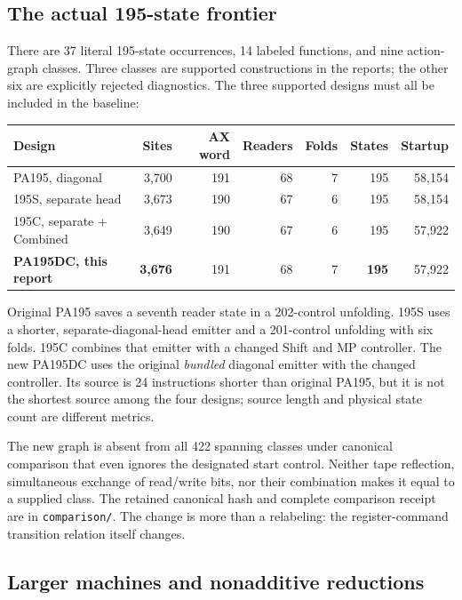 \documentclass[11pt,letterpaper]{article}
\newcommand{\file}[1]{\texttt{\nolinkurl{#1}}}
\begin{document}
\subsection{The actual 195-state frontier}

There are 37 literal 195-state occurrences, 14 labeled functions, and nine
action-graph classes. Three classes are supported constructions in the
reports; the other six are explicitly rejected diagnostics. The three
supported designs must all be included in the baseline:

\begin{center}\small
\begin{tabular}{@{}lrrrrrr@{}}
\toprule
Design&Sites&AX word&Readers&Folds&States&Startup\\\midrule
PA195, diagonal&3,700&191&68&7&195&58,154\\
195S, separate head&3,673&190&67&6&195&58,154\\
195C, separate + Combined&3,649&190&67&6&195&57,922\\
\textbf{PA195DC, this report}&\textbf{3,676}&191&68&7&\textbf{195}&57,922\\
\bottomrule
\end{tabular}
\end{center}

Original PA195 saves a seventh reader state in a 202-control unfolding.
195S uses a shorter, separate-diagonal-head emitter and a 201-control
unfolding with six folds. 195C combines that emitter with a changed Shift
and MP controller. The new PA195DC uses the original \emph{bundled}
diagonal emitter with the changed controller. Its source is 24 instructions
shorter than original PA195, but it is not the shortest source among the
four designs; source length and physical state count are different metrics.

The new graph is absent from all 422 spanning classes under canonical
comparison that even ignores the designated start control. Neither tape
reflection, simultaneous exchange of read/write bits, nor their combination
makes it equal to a supplied class. The retained canonical hash and complete
comparison receipt are in \file{comparison/}. The change is more than a
relabeling: the register-command transition relation itself changes.

\subsection{Larger machines and nonadditive reductions}
\end{document}

